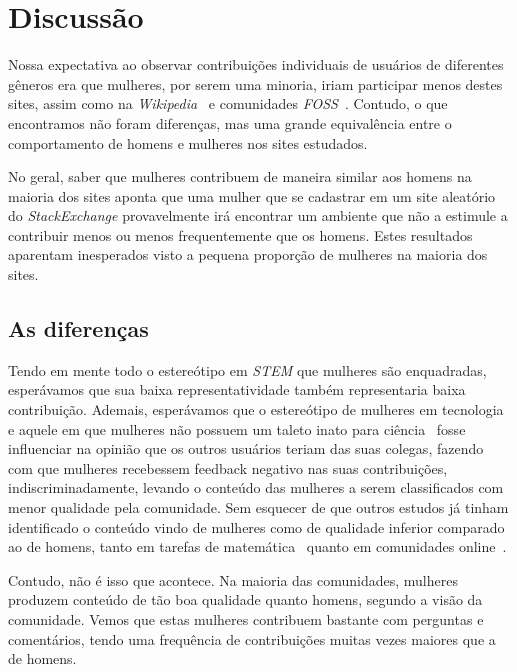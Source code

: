 \chapter{Discussão}

Nossa expectativa ao observar contribuições individuais de usuários de diferentes gêneros era que mulheres, por serem uma minoria, iriam participar menos destes sites, assim como na \emph{Wikipedia}~\cite{antin2011gender} e comunidades \emph{FOSS}~\cite{rustad2011suck}. Contudo, o que encontramos não foram diferenças, mas uma grande equivalência entre o comportamento de homens e mulheres nos sites estudados. 

No geral, saber que mulheres contribuem de maneira similar aos homens na maioria dos sites aponta que uma mulher que se cadastrar em um site aleatório do \emph{StackExchange} provavelmente irá encontrar um ambiente que não a estimule a contribuir menos ou menos frequentemente que os homens. Estes resultados aparentam inesperados visto a pequena proporção de mulheres na maioria dos sites.

\section{As diferenças}

Tendo em mente todo o estereótipo em \emph{STEM} que mulheres são enquadradas, esperávamos que sua baixa representatividade também representaria baixa contribuição. Ademais, esperávamos que o estereótipo de mulheres em tecnologia~\cite{hyde1990gender} e aquele em que mulheres não possuem um taleto inato para ciência~\cite{leslie2015expectations} fosse influenciar na opinião que os outros usuários teriam das suas colegas, fazendo com que mulheres recebessem feedback negativo nas suas contribuições, indiscriminadamente, levando o conteúdo das mulheres a serem classificados com menor qualidade pela comunidade. Sem esquecer de que outros estudos já tinham identificado o conteúdo vindo de mulheres como de qualidade inferior comparado ao de homens, tanto em tarefas de matemática~\cite{campbell1986effects} quanto em comunidades online~\cite{collier2012conflict}.

Contudo, não é isso que acontece. Na maioria das comunidades, mulheres produzem conteúdo de tão boa qualidade quanto homens, segundo a visão da comunidade. Vemos que estas mulheres contribuem bastante com perguntas e comentários, tendo uma frequência de contribuições muitas vezes maiores que a de homens. 

